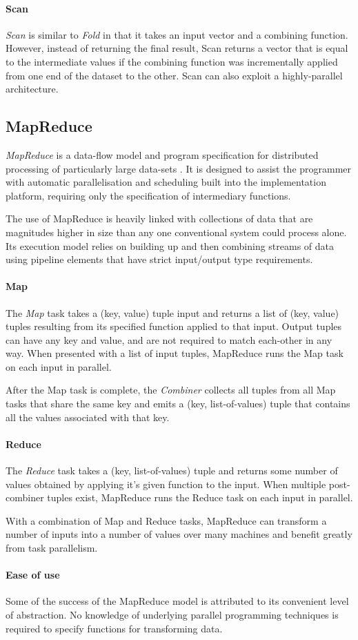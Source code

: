 \paragraph{Scan}
\emph{Scan} is similar to \emph{Fold} in that it takes an input vector and a combining function. However, instead of returning the final result, Scan returns a vector that is equal to the intermediate values if the combining function was incrementally applied from one end of the dataset to the other. Scan can also exploit a highly-parallel architecture.
\subsection{MapReduce}
\emph{MapReduce} is a data-flow model and program specification for distributed processing of particularly large data-sets \cite{mapreduce}. It is designed to assist the programmer with automatic parallelisation and scheduling built into the implementation platform, requiring only the specification of intermediary functions.

The use of MapReduce is heavily linked with collections of data that are magnitudes higher in size than any one conventional system could process alone. Its execution model relies on building up and then combining streams of data using pipeline elements that have strict input/output type requirements.
\paragraph{Map}
The \emph{Map} task takes a (key, value) tuple input and returns a list of (key, value) tuples resulting from its specified function applied to that input. Output tuples can have any key and value, and are not required to match each-other in any way. When presented with a list of input tuples, MapReduce runs the Map task on each input in parallel.

After the Map task is complete, the \emph{Combiner} collects all tuples from all Map tasks that share the same key and emits a (key, list-of-values) tuple that contains all the values associated with that key.
\paragraph{Reduce}
The \emph{Reduce} task takes a (key, list-of-values) tuple and returns some number of values obtained by applying it's given function to the input. When multiple post-combiner tuples exist, MapReduce runs the Reduce task on each input in parallel.

With a combination of Map and Reduce tasks, MapReduce can transform a number of inputs into a number of values over many machines and benefit greatly from task parallelism.

\paragraph{Ease of use}
Some of the success of the MapReduce model is attributed to its convenient level of abstraction. No knowledge of underlying parallel programming techniques is required to specify functions for transforming data.

